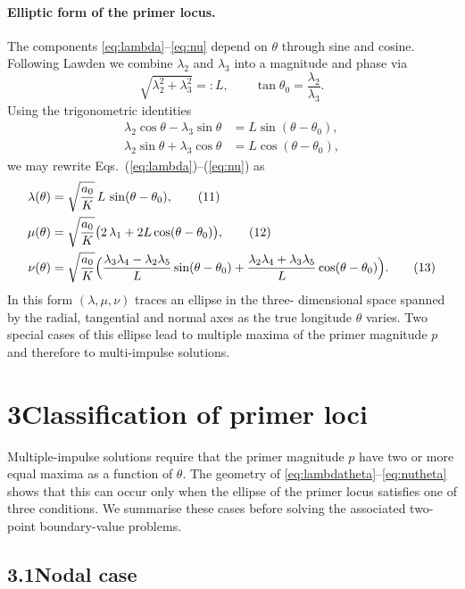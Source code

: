 \documentclass[12pt]{article}
\begin{document}
\paragraph{Elliptic form of the primer locus.}  The components
\eqref{eq:lambda}--\eqref{eq:nu} depend on $\theta$ through sine and
cosine.  Following Lawden we combine $\lambda_2$ and $\lambda_3$ into
a magnitude and phase via
\[
  \sqrt{\lambda_2^2 + \lambda_3^2} =: L,\qquad
  \tan \theta_0 = \frac{\lambda_2}{\lambda_3}.
\]
Using the trigonometric identities
\begin{align}
  \lambda_2\cos\theta - \lambda_3\sin\theta &= L\sin(\theta - \theta_0),\\
  \lambda_2\sin\theta + \lambda_3\cos\theta &= L\cos(\theta - \theta_0),
\end{align}
we may rewrite Eqs.~(\ref{eq:lambda})--(\ref{eq:nu}) as
\begin{align}
  \lambda(\theta) &= \sqrt{\frac{a_0}{K}}\,L\,\sin(\theta - \theta_0),
    \tag{11}\label{eq:lambdatheta}\\
  \mu(\theta) &= \sqrt{\frac{a_0}{K}}
    \bigl(2\,\lambda_1 + 2 L\cos(\theta - \theta_0)\bigr),
    \tag{12}\label{eq:mutheta}\\
  \nu(\theta) &= \sqrt{\frac{a_0}{K}}
    \Bigl( \frac{\lambda_3\lambda_4 - \lambda_2\lambda_5}{L}
           \sin(\theta - \theta_0)
           + \frac{\lambda_2\lambda_4 + \lambda_3\lambda_5}{L}
           \cos(\theta - \theta_0)\Bigr).
    \tag{13}\label{eq:nutheta}
\end{align}
In this form $(\lambda,\mu,\nu)$ traces an ellipse in the three-
dimensional space spanned by the radial, tangential and normal axes as
the true longitude $\theta$ varies.  Two special cases of this
ellipse lead to multiple maxima of the primer magnitude $p$ and
therefore to multi-impulse solutions.

\section*{3\quad Classification of primer loci}

Multiple-impulse solutions require that the primer magnitude $p$ have
two or more equal maxima as a function of $\theta$.  The geometry of
\eqref{eq:lambdatheta}--\eqref{eq:nutheta} shows that this can occur
only when the ellipse of the primer locus satisfies one of three
conditions.  We summarise these cases before solving the associated
two-point boundary-value problems.

\subsection*{3.1\quad Nodal case}
\end{document}
